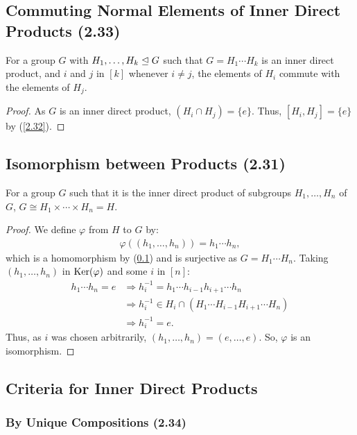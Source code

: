 \subsection{Commuting Normal Elements of Inner Direct Products (2.33)} \label{2.33}

For a group $G$ with $H_1, \ldots, H_k \trianglelefteq G$ such that
$G = H_1 \cdots H_k$ is an inner direct product, and $i$ and $j$ in $[k]$ 
whenever $i \neq j$, the elements of $H_i$ commute with the elements of $H_j$.

\begin{proof}
    As $G$ is an inner direct product,
    $(H_i \cap H_j) = \{e\}$. Thus, $[H_i, H_j] = \{e\}$ by (\ref{2.32}).
\end{proof}

\subsection{Isomorphism between Products (2.31)} \label{2.31}

For a group $G$ such that it is the inner direct product of subgroups 
$H_1, \ldots, H_n$ of $G$, $G \cong H_1 \times \cdots \times H_n = H$.

\begin{proof}
    We define $\varphi$ from $H$ to $G$ by: \begin{align*}
        \varphi((h_1, \ldots, h_n)) = h_1 \cdots h_n,
    \end{align*} which is a homomorphism by (\ref{2.33}) and is
    surjective as $G = H_1 \cdots H_n$. Taking $(h_1, \ldots, h_n)$ in $\operatorname{Ker}(\varphi)$
    and some $i$ in $[n]$: \begin{align*}
        h_1 \cdots h_n = e
        &\Longrightarrow h_i^{-1} = h_1 \cdots h_{i - 1}h_{i + 1} \cdots h_n \\
        &\Longrightarrow h_i^{-1} \in H_i \cap (H_1 \cdots H_{i - 1} H_{i + 1} \cdots H_n) \\
        &\Longrightarrow h_i^{-1} = e.
    \end{align*} Thus, as $i$ was chosen arbitrarily, $(h_1, \ldots, h_n) = (e, \ldots, e)$.
    So, $\varphi$ is an isomorphism.
\end{proof}

\subsection{Criteria for Inner Direct Products}

\subsubsection{By Unique Compositions (2.34)} \label{2.34}

